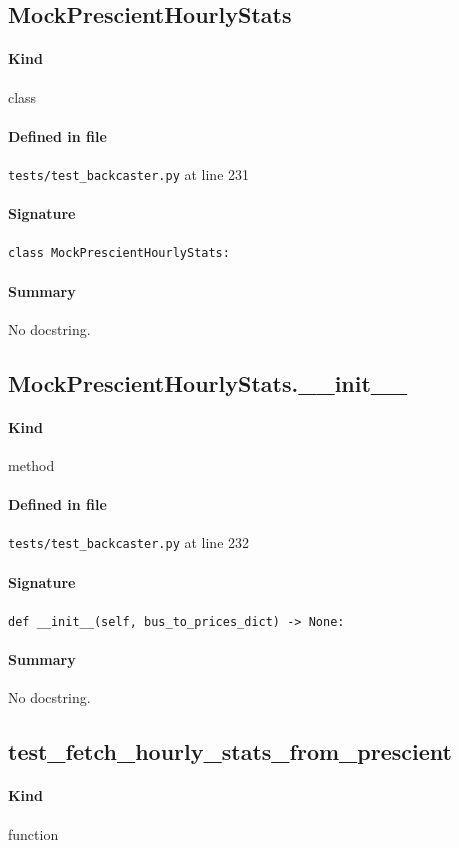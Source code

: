 \documentclass[11pt]{report}
\begin{document}
\subsection{MockPrescientHourlyStats}
\label{def:tests-test_backcaster.py:MockPrescientHourlyStats:L231}
\paragraph{Kind} class
\paragraph{Defined in file} \texttt{tests/test\_backcaster.py} at line 231
\paragraph{Signature} \texttt{class MockPrescientHourlyStats:}
\paragraph{Summary} No docstring.
\subsection{MockPrescientHourlyStats.\_\_init\_\_}
\label{def:tests-test_backcaster.py:MockPrescientHourlyStats.__init__:L232}
\paragraph{Kind} method
\paragraph{Defined in file} \texttt{tests/test\_backcaster.py} at line 232
\paragraph{Signature} \texttt{def \_\_init\_\_(self, bus\_to\_prices\_dict) -> None:}
\paragraph{Summary} No docstring.
\subsection{test\_fetch\_hourly\_stats\_from\_prescient}
\label{def:tests-test_backcaster.py:test_fetch_hourly_stats_from_prescient:L237}
\paragraph{Kind} function
\end{document}
